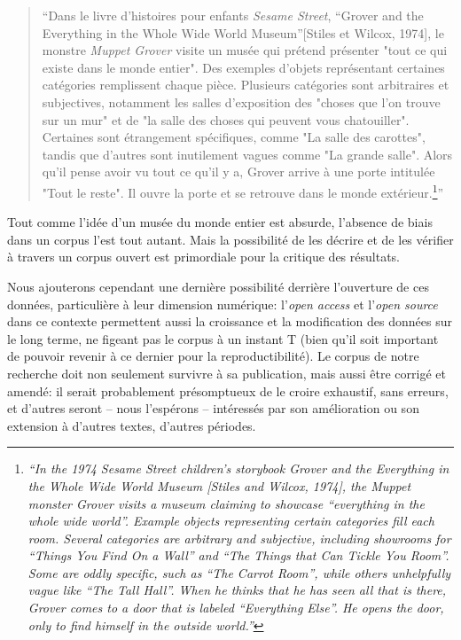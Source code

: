 \begin{quote}{\textcite{raji2021ai}}
    \enquote{Dans le livre d'histoires pour enfants \textit{Sesame Street}, ``Grover and the Everything in the Whole Wide World Museum''[Stiles et Wilcox, 1974], le monstre \textit{Muppet Grover} visite un musée qui prétend présenter "tout ce qui existe dans le monde entier". Des exemples d'objets représentant certaines catégories remplissent chaque pièce. Plusieurs catégories sont arbitraires et subjectives, notamment les salles d'exposition des "choses que l'on trouve sur un mur" et de "la salle des choses qui peuvent vous chatouiller". Certaines sont étrangement spécifiques, comme "La salle des carottes", tandis que d'autres sont inutilement vagues comme "La grande salle". Alors qu'il pense avoir vu tout ce qu'il y a, Grover arrive à une porte intitulée "Tout le reste". Il ouvre la porte et se retrouve dans le monde extérieur.\footnote{\textit{``In the 1974 Sesame Street children’s storybook Grover and the Everything in the Whole Wide World Museum [Stiles and Wilcox, 1974], the Muppet monster Grover visits a museum claiming to showcase “everything in the whole wide world”. Example objects representing certain categories fill each room. Several categories are arbitrary and subjective, including showrooms for “Things You Find On a Wall” and “The Things that Can Tickle You Room”. Some are oddly specific, such as “The Carrot Room”, while others unhelpfully vague like “The Tall Hall”. When he thinks that he has seen all that is there, Grover comes to a door that is labeled “Everything Else”. He opens the door, only to find himself in the outside world.''}}}
\end{quote}

Tout comme l'idée d'un musée du monde entier est absurde, l'absence de biais dans un corpus l'est tout autant. Mais la possibilité de les décrire et de les vérifier à travers un corpus ouvert est primordiale pour la critique des résultats.

Nous ajouterons cependant une dernière possibilité derrière l'ouverture de ces données, particulière à leur dimension numérique: l'\textit{open access} et l'\textit{open source} dans ce contexte permettent aussi la croissance et la modification des données sur le long terme, ne figeant pas le corpus à un instant T (bien qu'il soit important de pouvoir revenir à ce dernier pour la reproductibilité). Le corpus de notre recherche doit non seulement survivre à sa publication, mais aussi être corrigé et amendé: il serait probablement présomptueux de le croire exhaustif, sans erreurs, et d'autres seront -- nous l'espérons -- intéressés par son amélioration ou son extension à d'autres textes, d'autres périodes.

